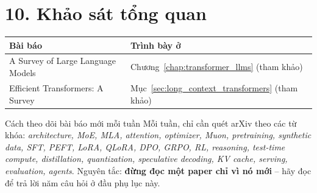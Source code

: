 \section*{10. Khảo sát tổng quan}
\begin{longtable}{@{}p{7.2cm}p{7.6cm}@{}}
\toprule
\textbf{Bài báo} & \textbf{Trình bày ở} \\
\midrule
\endhead
A Survey of Large Language Models \cite{zhao2023survey} & Chương~\ref{chap:transformer_llms} (tham khảo) \\
Efficient Transformers: A Survey \cite{tay2022efficient} & Mục~\ref{sec:long_context_transformers} (tham khảo) \\
\bottomrule
\end{longtable}

\begin{assess}{Cách theo dõi bài báo mới mỗi tuần}
Mỗi tuần, chỉ cần quét arXiv theo các từ khóa: \emph{architecture, MoE, MLA, attention, optimizer, Muon, pretraining, synthetic data, SFT, PEFT, LoRA, QLoRA, DPO, GRPO, RL, reasoning, test-time compute, distillation, quantization, speculative decoding, KV cache, serving, evaluation, agents}. Nguyên tắc: \textbf{đừng đọc một paper chỉ vì nó mới} -- hãy đọc để trả lời năm câu hỏi ở đầu phụ lục này.
\end{assess}
